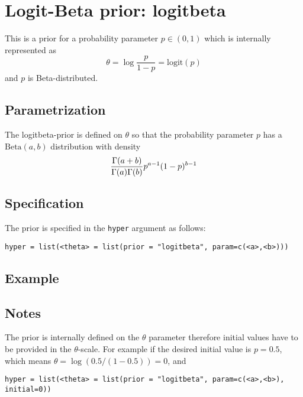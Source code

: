 \documentclass[a4paper,11pt]{article}
\begin{document}
\section*{Logit-Beta prior: logitbeta}

This is a prior for a probability parameter $p\in(0,1)$ which is
internally represented as
\[
\theta = \log\frac{p}{1-p}  = \text{logit}(p)
\]
and $p$ is Beta-distributed. 

\subsection*{Parametrization}

The logitbeta-prior is defined on $\theta$ so that the probability parameter $p$
has a $\text{Beta}(a,b)$ distribution with density
\begin{displaymath}
   {\Gamma(a+b) \over \Gamma(a) \Gamma(b)} p^{a-1} (1-p)^{b-1} 
\end{displaymath}

\subsection*{Specification}

The prior is specified in the {\tt hyper} argument as follows:
\begin{center}
    {\tt hyper = list(<theta> = list(prior = "logitbeta", param=c(<a>,<b>)))}
\end{center}

\subsection*{Example}

\subsection*{Notes}

The prior is internally defined on the $\theta$ parameter therefore
initial values have to be provided in the $\theta$-scale. For example
if the desired initial value is $p=0.5$, which means
$\theta=\log(0.5 / (1-0.5))=0$, and 
\begin{center}
    {\tt hyper = list(<theta> = list(prior = "logitbeta",
        param=c(<a>,<b>), initial=0))}
\end{center}
\end{document}
